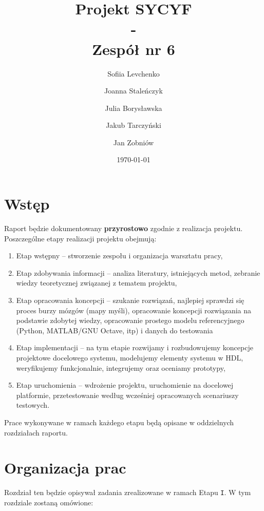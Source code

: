 \documentclass[a4paper,titleauthor]{mwart}
\title{{\Huge  Projekt SYCYF}\\ - \\{\Large Zespół nr 6}\\ }
\author{Sofiia Levchenko \and Joanna Staleńczyk \and Julia Borysławska \and Jakub Tarczyński \and Jan Zobniów}
\date{\today}
\begin{document}
	
\maketitle
\tableofcontents

\section{Wstęp}
\label{sec:wstep}%

Raport będzie dokumentowany \textbf{przyrostowo} zgodnie z realizacja projektu. Poszczególne etapy realizacji projektu obejmują: 

\renewcommand{\labelenumi}{\Roman{enumi}}
\begin{enumerate}\setlength{\itemsep}{0.2\baselineskip} 
	\item Etap wstępny – stworzenie zespołu i organizacja warsztatu pracy, 
	\item Etap zdobywania informacji – analiza literatury, istniejących metod, zebranie wiedzy teoretycznej związanej z tematem projektu, 
	\item Etap opracowania koncepcji – szukanie rozwiązań, najlepiej sprawdzi się proces burzy mózgów (mapy myśli), opracowanie koncepcji rozwiązania  na podstawie zdobytej wiedzy, opracowanie prostego modelu referencyjnego (Python, MATLAB/GNU Octave, itp) i danych do testowania  
	\item Etap implementacji – na tym etapie rozwijamy i rozbudowujemy koncepcje projektowe docelowego systemu, modelujemy elementy systemu w HDL, weryfikujemy funkcjonalnie, integrujemy oraz oceniamy prototypy, 
	\item Etap uruchomienia – wdrożenie projektu, uruchomienie na docelowej platformie, przetestowanie według wcześniej opracowanych scenariuszy testowych. 
\end{enumerate}

Prace wykonywane w ramach każdego etapu będą opisane w oddzielnych rozdziałach raportu.

\section{Organizacja prac}
\label{sec:organizacja}

Rozdział ten będzie opisywał zadania zrealizowane w ramach Etapu \texttt{I}. W tym rozdziale zostaną omówione:
\end{document}
